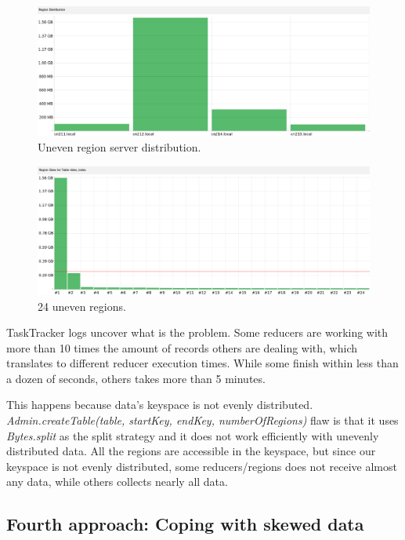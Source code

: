 \begin{figure}[htb]
\centering
\includegraphics[width=1\textwidth,height=0.31\textheight]{./images/regiondistribution1.png}
\caption{Uneven region server distribution.} \label{fig:regionDistribution}
\end{figure}



\begin{figure}[htb]
\centering
\includegraphics[width=1\textwidth,height=0.31\textheight]{./images/24regions1.png}
\caption{24 uneven regions.} \label{fig:24evenRegions}
\end{figure}

TaskTracker logs uncover what is the problem. Some reducers are working with more than 10 times the amount of records others are dealing with, which translates to different reducer execution times. While some finish within less than a dozen of seconds, others takes more than 5 minutes. 
\par
This happens because data's keyspace is not evenly distributed. \textit{Admin.createTable(table, startKey, endKey, numberOfRegions)} flaw is that it uses \textit{Bytes.split} as the split strategy and it does not work efficiently with unevenly distributed data. All the regions are accessible in the keyspace, but since our keyspace is not evenly distributed, some reducers/regions does not receive almost any data, while others collects nearly all data.



\subsection{Fourth approach: Coping with skewed data}

